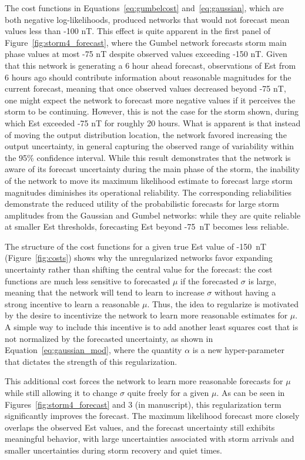 \documentclass{agujournal2018}
\begin{document}
The cost functions in Equations~\ref{eq:gumbelcost} and~\ref{eq:gaussian}, which are both negative log-likelihoods, produced networks that would not forecast mean values less than -100 nT. This effect is quite apparent in the first panel of Figure~\ref{fig:storm4_forecast}, where the Gumbel network forecasts storm main phase values at most -75 nT despite observed values exceeding -150 nT. Given that this network is generating a 6 hour ahead forecast, observations of Est from 6 hours ago should contribute information about reasonable magnitudes for the current forecast, meaning that once observed values decreased beyond -75 nT, one might expect the network to forecast more negative values if it perceives the storm to be continuing. However, this is not the case for the storm shown, during which Est exceeded -75 nT for roughly 20 hours. What is apparent is that instead of moving the output distribution location, the network favored increasing the output uncertainty, in general capturing the observed range of variability within the 95\% confidence interval. While this result demonstrates that the network is aware of its forecast uncertainty during the main phase of the storm, the inability of the network to move its maximum likelihood estimate to forecast large storm magnitudes diminishes its operational reliability. The corresponding reliabilities demonstrate the reduced utility of the probabilistic forecasts for large storm amplitudes from the Gaussian and Gumbel networks: while they are quite reliable at smaller Est thresholds, forecasting Est beyond -75~nT becomes less reliable.

The structure of the cost functions for a given true Est value of -150~nT (Figure~\ref{fig:costs}) shows why the unregularized networks favor expanding uncertainty rather than shifting the central value for the forecast: the cost functions are much less sensitive to forecasted $\mu$ if the forecasted $\sigma$ is large, meaning that the network will tend to learn to increase $\sigma$ without having a strong incentive to learn a reasonable $\mu$. Thus, the idea to regularize is motivated by the desire to incentivize the network to learn more reasonable estimates for $\mu$. A simple way to include this incentive is to add another least squares cost that is not normalized by the forecasted uncertainty, as shown in Equation~\ref{eq:gaussian_mod}, where the quantity $\alpha$ is a new hyper-parameter that dictates the strength of this regularization. 

This additional cost forces the network to learn more reasonable forecasts for $\mu$ while still allowing it to change $\sigma$ quite freely for a given $\mu$. As can be seen in Figures~\ref{fig:storm4_forecast} and 3 (in manuscript), this regularization term significantly improves the forecast. The maximum likelihood forecast more closely overlaps the observed Est values, and the forecast uncertainty still exhibits meaningful behavior, with large uncertainties associated with storm arrivals and smaller uncertainties during storm recovery and quiet times. 
\end{document}
